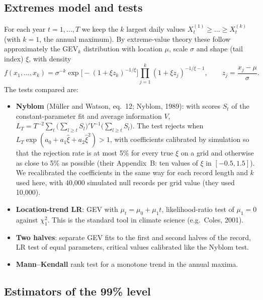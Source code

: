 \documentclass[11pt]{article}
\begin{document}
\subsection{Extremes model and tests}

For each year $t=1,\dots,T$ we keep the $k$ largest daily values
$X_t^{(1)}\ge\dots\ge X_t^{(k)}$ (with $k=1$, the annual maximum). By extreme-value theory these
follow approximately the GEV$_k$ distribution with location $\mu$, scale $\sigma$ and shape
(tail index) $\xi$, with density
\[
f(x_1,\dots,x_k)=\sigma^{-k}\exp\!\Big[-(1+\xi z_k)^{-1/\xi}\Big]\prod_{j=1}^{k}(1+\xi z_j)^{-1/\xi-1},
\qquad z_j=\frac{x_j-\mu}{\sigma}.
\]
The tests compared are:
\begin{itemize}
\item \textbf{Nyblom} (M\"uller and Watson, eq.~12; Nyblom, 1989): with scores $S_t$ of the
  constant-parameter fit and average information $V$,
  $L_T=T^{-2}\sum_t\big(\sum_{l\ge t}S_l\big)'V^{-1}\big(\sum_{l\ge t}S_l\big)$. The test rejects
  when $L_T\exp(a_0+a_1\hat\xi+a_2\hat\xi^2)>1$, with coefficients calibrated by simulation so that
  the rejection rate is at most 5\% for every true $\xi$ on a grid and otherwise as close to 5\% as
  possible (their Appendix~B: ten values of $\xi$ in $[-0.5,1.5]$). We recalibrated the
  coefficients in the same way for each record length and $k$ used here, with 40,000 simulated
  null records per grid value (they used 10,000).
\item \textbf{Location-trend LR}: GEV with $\mu_t=\mu_0+\mu_1 t$, likelihood-ratio test of
  $\mu_1=0$ against $\chi^2_1$. This is the standard tool in climate science (e.g.\ Coles, 2001).
\item \textbf{Two halves}: separate GEV fits to the first and second halves of the record, LR
  test of equal parameters, critical values calibrated like the Nyblom test.
\item \textbf{Mann--Kendall} rank test for a monotone trend in the annual maxima.
\end{itemize}

\subsection{Estimators of the 99\% level}
\end{document}
